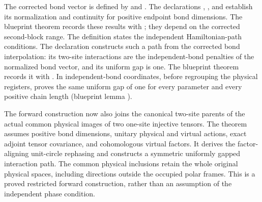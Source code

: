 \documentclass{article}
\begin{document}
The corrected bond vector is defined by
 and
. The declarations
,
, and
 establish
its normalization and continuity for positive endpoint bond dimensions.
The blueprint theorem  records
these results with ; they depend on the corrected second-block
range. The definition
 states the independent
Hamiltonian-path conditions. The declaration
 constructs such a path
from the corrected bond interpolation: its two-site interactions are the
independent-bond penalties of the normalized bond vector, and its uniform gap
is one. The blueprint theorem 
records it with .
In independent-bond coordinates, before regrouping the physical registers,
 proves the
same uniform gap of one for every parameter and every positive chain length
(blueprint lemma ).

The forward construction now also joins the canonical two-site parents of
the actual common physical images of two one-site injective tensors.
The theorem
assumes positive bond dimensions, unitary physical and virtual actions,
exact adjoint tensor covariance, and cohomologous virtual factors. It derives
the factor-aligning unit-circle rephasing and constructs a symmetric uniformly
gapped interaction path. The common physical inclusions retain the whole
original physical spaces, including directions outside the occupied polar
frames. This is a proved restricted forward construction, rather than an
assumption of the independent phase condition.
\end{document}
